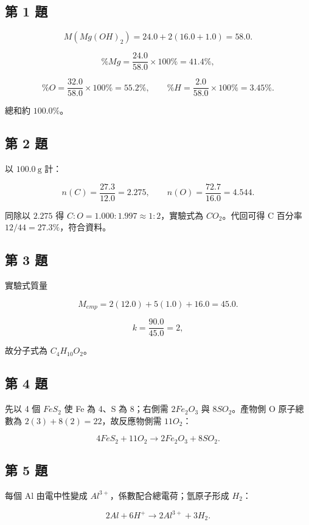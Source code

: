 \documentclass[11pt,a4paper]{article}
\begin{document}
\subsection{第 1 題}\label{ux7b2c-1-ux984c}

\[
M(Mg(OH)_2)=24.0+2(16.0+1.0)=58.0.
\]

\[
\%Mg=\frac{24.0}{58.0}\times100\%=41.4\%,
\]

\[
\%O=\frac{32.0}{58.0}\times100\%=55.2\%,
\qquad
\%H=\frac{2.0}{58.0}\times100\%=3.45\%.
\]

總和約 \(100.0\%\)。

\subsection{第 2 題}\label{ux7b2c-2-ux984c}

以 \(100.0\ \mathrm g\) 計：

\[
n(C)=\frac{27.3}{12.0}=2.275,
\qquad
n(O)=\frac{72.7}{16.0}=4.544.
\]

同除以 \(2.275\) 得 \(C:O=1.000:1.997\approx1:2\)，實驗式為 \(CO_2\)。代回可得 C 百分率 \(12/44=27.3\%\)，符合資料。

\subsection{第 3 題}\label{ux7b2c-3-ux984c}

實驗式質量

\[
M_{emp}=2(12.0)+5(1.0)+16.0=45.0.
\]

\[
k=\frac{90.0}{45.0}=2,
\]

故分子式為 \(C_4H_{10}O_2\)。

\subsection{第 4 題}\label{ux7b2c-4-ux984c}

先以 4 個 \(FeS_2\) 使 Fe 為 4、S 為 8；右側需 \(2Fe_2O_3\) 與 \(8SO_2\)。產物側 O 原子總數為 \(2(3)+8(2)=22\)，故反應物側需 \(11O_2\)：

\[
\boxed{4FeS_2+11O_2\rightarrow2Fe_2O_3+8SO_2}.
\]

\subsection{第 5 題}\label{ux7b2c-5-ux984c}

每個 Al 由電中性變成 \(Al^{3+}\)，係數配合總電荷；氫原子形成 \(H_2\)：

\[
\boxed{2Al+6H^+\rightarrow2Al^{3+}+3H_2}.
\]
\end{document}
